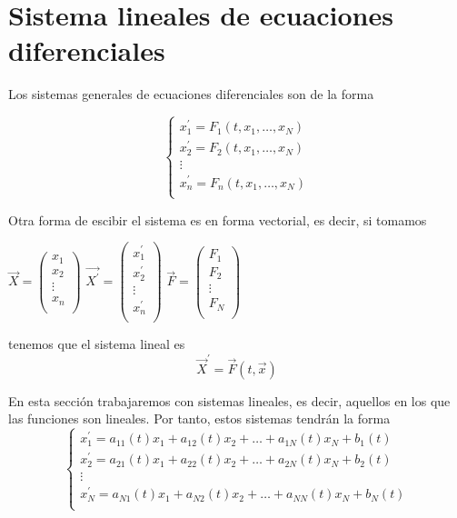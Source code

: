\section{Sistema lineales de ecuaciones diferenciales}
Los sistemas generales de ecuaciones diferenciales son de la forma

\begin{equation*}
  \left\lbrace
  \begin{array}{l}
     x_1^\prime = F_1(t, x_1, \hdots, x_N)\\
     x_2^\prime = F_2(t, x_1, \hdots, x_N)\\
     \vdots\\
     x_n^\prime = F_n(t, x_1, \hdots, x_N)\\
  \end{array}
  \right.
\end{equation*}

Otra forma de escibir el sistema es en forma vectorial, es decir, si tomamos
\begin{center}
$\vec{X} = \begin{pmatrix}
x_1\\
x_2\\
\vdots\\
x_n\\
\end{pmatrix}$ $\vec{X^\prime} = \begin{pmatrix}
x_1^\prime\\
x_2^\prime\\
\vdots\\
x_n^\prime\\
\end{pmatrix}$ $\vec{F} = \begin{pmatrix}
F_1\\
F_2\\
\vdots\\
F_N\\
\end{pmatrix}$
\end{center}
tenemos que el sistema lineal es $$\vec{X}^\prime = \vec{F}(t, \vec{x})$$

En esta sección trabajaremos con sistemas lineales, es decir, aquellos en los que las funciones son lineales. Por tanto, estos sistemas tendrán la forma
\begin{equation*}
  \left\lbrace
  \begin{array}{l}
     x_1^\prime = a_{11}(t)x_1+a_{12}(t)x_2+\hdots+a_{1N}(t)x_N+b_1(t)\\
     x_2^\prime = a_{21}(t)x_1+a_{22}(t)x_2+\hdots+a_{2N}(t)x_N+b_2(t)\\
     \vdots\\
     x_N^\prime = a_{N1}(t)x_1+a_{N2}(t)x_2+\hdots+a_{NN}(t)x_N+b_N(t)\\
  \end{array}
  \right.
\end{equation*}

